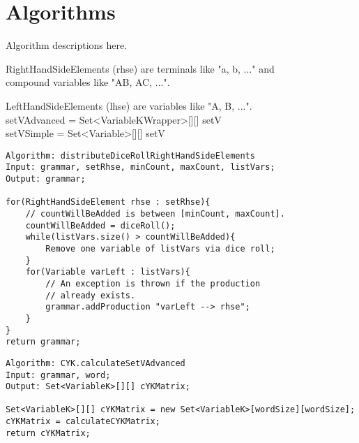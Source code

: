 
\section{Algorithms}\label{algorithms}
Algorithm descriptions here.

\noindent RightHandSideElements (rhse) are terminals like "a, b, ..." and \\
compound variables like "AB, AC, ...".

\noindent LeftHandSideElements (lhse) are variables like "A, B, ...". \\

\noindent setVAdvanced = Set<VariableKWrapper>[][] setV \\
\noindent setVSimple = Set<Variable>[][] setV

\lstset{language=java}
\begin{lstlisting}[frame=htrbl, caption={distributeDiceRollRightHandSideElements}, 
label={lst:distributeDiceRollRightHandSideElements}]
Algorithm: distributeDiceRollRightHandSideElements
Input: grammar, setRhse, minCount, maxCount, listVars;
Output: grammar;

for(RightHandSideElement rhse : setRhse){
	// countWillBeAdded is between [minCount, maxCount]. 
	countWillBeAdded = diceRoll();
	while(listVars.size() > countWillBeAdded){
		Remove one variable of listVars via dice roll;
	}
	for(Variable varLeft : listVars){
		// An exception is thrown if the production 
		// already exists.
		grammar.addProduction "varLeft --> rhse";
	}
}
return grammar;
\end{lstlisting}

\lstset{language=java}
\begin{lstlisting}[frame=htrbl, caption={CYK.calculateSetVAdvanced}, 
label={lst:CYK.calculateSetVAdvanced}]
Algorithm: CYK.calculateSetVAdvanced
Input: grammar, word;
Output: Set<VariableK>[][] cYKMatrix;

Set<VariableK>[][] cYKMatrix = new Set<VariableK>[wordSize][wordSize];
cYKMatrix = calculateCYKMatrix;
return cYKMatrix;
\end{lstlisting}

\pagebreak

